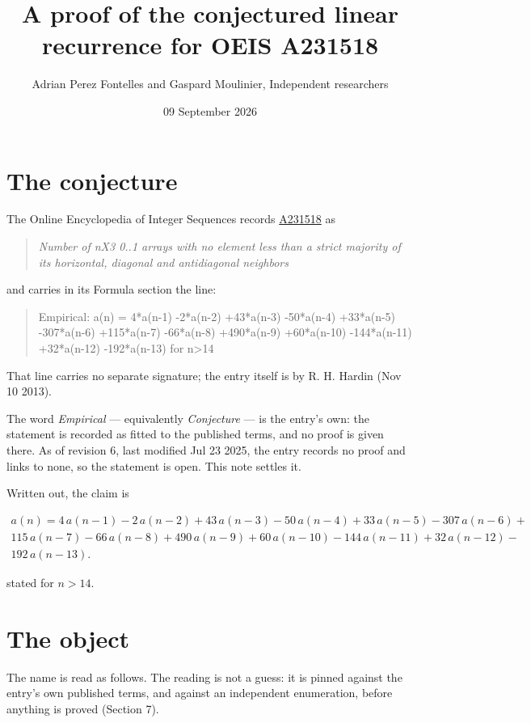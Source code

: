 \documentclass[11pt]{article}
\title{A proof of the conjectured linear recurrence for OEIS A231518}
\author{Adrian Perez Fontelles and Gaspard Moulinier, Independent researchers}
\date{09 September 2026}
\theoremstyle{definition}
\begin{document}
\maketitle
\section{The conjecture}

The Online Encyclopedia of Integer Sequences records \href{https://oeis.org/A231518}{A231518} as

\begin{quote}\itshape Number of nX3 0..1 arrays with no element less than a strict majority of its horizontal, diagonal and antidiagonal neighbors\end{quote}

and carries in its Formula section the line:

\begin{quote}\ttfamily Empirical: a(n) = 4*a(n-1) -2*a(n-2) +43*a(n-3) -50*a(n-4) +33*a(n-5) -307*a(n-6) +115*a(n-7) -66*a(n-8) +490*a(n-9) +60*a(n-10) -144*a(n-11) +32*a(n-12) -192*a(n-13) for n>14\end{quote}

That line carries no separate signature; the entry itself is by R. H. Hardin (Nov 10 2013).

The word {\itshape Empirical} --- equivalently {\itshape Conjecture} --- is the entry's own: the statement is recorded as fitted to the published terms, and no proof is given there. As of revision 6, last modified Jul 23 2025, the entry records no proof and links to none, so the statement is open. This note settles it.

Written out, the claim is

\begin{multline*} a(n) = 4\,a(n-1) - 2\,a(n-2) + 43\,a(n-3) - 50\,a(n-4) + 33\,a(n-5) - 307\,a(n-6) + \\ 115\,a(n-7) - 66\,a(n-8) + 490\,a(n-9) + 60\,a(n-10) - 144\,a(n-11) + 32\,a(n-12) - \\ 192\,a(n-13). \end{multline*}

stated for $n > 14$.

\section{The object}

The name is read as follows. The reading is not a guess: it is pinned against the entry's own published terms, and against an independent enumeration, before anything is proved (Section 7).
\end{document}

